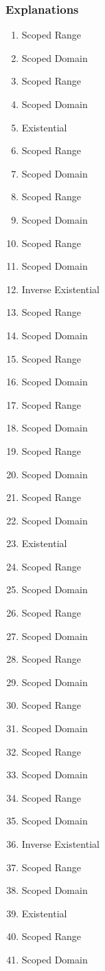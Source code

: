 \subsubsection{Explanations}
\begin{enumerate}
  \item Scoped Range
  \item Scoped Domain
  \item Scoped Range
  \item Scoped Domain
  \item Existential
  \item Scoped Range
  \item Scoped Domain
  \item Scoped Range
  \item Scoped Domain
  \item Scoped Range
  \item Scoped Domain
  \item Inverse Existential
  \item Scoped Range
  \item Scoped Domain
  \item Scoped Range
  \item Scoped Domain
  \item Scoped Range
  \item Scoped Domain
  \item Scoped Range
  \item Scoped Domain
  \item Scoped Range
  \item Scoped Domain
  \item Existential
  \item Scoped Range
  \item Scoped Domain
  \item Scoped Range
  \item Scoped Domain
  \item Scoped Range
  \item Scoped Domain
  \item Scoped Range
  \item Scoped Domain
  \item Scoped Range
  \item Scoped Domain
  \item Scoped Range
  \item Scoped Domain
  \item Inverse Existential
  \item Scoped Range
  \item Scoped Domain
  \item Existential
  \item Scoped Range
  \item Scoped Domain
\end{enumerate}

